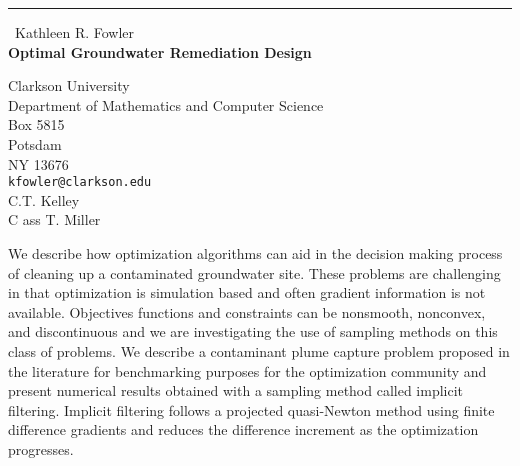 \documentclass{report}
\begin{document}
\begin{center}
\rule{6in}{1pt} \
{\large Kathleen R. Fowler \\
{\bf Optimal Groundwater Remediation Design}}

Clarkson University \\ Department of Mathematics and Computer Science \\ Box 5815 \\ Potsdam \\ NY 13676
\\
{\tt kfowler@clarkson.edu}\\
C.T. Kelley\\
C ass T. Miller\end{center}

We describe how optimization algorithms can aid in the decision making
process of cleaning up a contaminated groundwater site. These problems
are challenging in that optimization is simulation based and often
gradient information is not available. Objectives functions and
constraints can be nonsmooth, nonconvex, and discontinuous and we are
investigating the use of sampling methods on this class of problems. We
describe a contaminant plume capture problem proposed in the literature
for benchmarking purposes for the optimization community and present
numerical results obtained with a sampling method called implicit
filtering. Implicit filtering follows a projected quasi-Newton method
using finite difference gradients and reduces the difference increment as
the optimization progresses.
\end{document}
